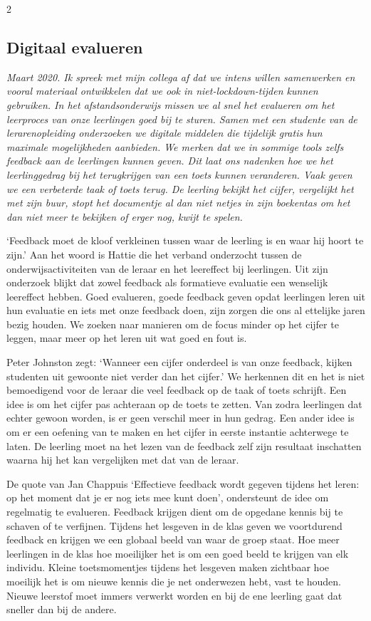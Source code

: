 \begin{multicols}{2}
\subsection{Digitaal evalueren}

\emph{Maart 2020. Ik spreek met mijn collega af dat we intens willen samenwerken en vooral materiaal ontwikkelen dat we ook in niet-lockdown-tijden kunnen gebruiken. In het afstandsonderwijs missen we al snel het evalueren om het leerproces van onze leerlingen goed bij te sturen. Samen met een studente van de lerarenopleiding onderzoeken we digitale middelen die tijdelijk gratis hun maximale mogelijkheden aanbieden. We merken dat we in sommige tools zelfs feedback aan de leerlingen kunnen geven. Dit laat ons nadenken hoe we het leerlinggedrag bij het terugkrijgen van een toets kunnen veranderen. Vaak geven we een verbeterde taak of toets terug. De leerling bekijkt het cijfer, vergelijkt het met zijn buur, stopt het documentje al dan niet netjes in zijn boekentas om het dan niet meer te bekijken of erger nog, kwijt te spelen.}

`Feedback moet de kloof verkleinen tussen waar de leerling is en waar hij hoort te zijn.' Aan het woord is Hattie die het verband onderzocht tussen de onderwijsactiviteiten van de leraar en het leereffect bij leerlingen. Uit zijn onderzoek blijkt dat zowel feedback als formatieve evaluatie een wenselijk leereffect hebben. Goed evalueren, goede feedback geven opdat leerlingen leren uit hun evaluatie en iets met onze feedback doen, zijn zorgen die ons al ettelijke jaren bezig houden. We zoeken naar manieren om de focus minder op het cijfer te leggen, maar meer op het leren uit wat goed en fout is. 

Peter Johnston zegt: `Wanneer een cijfer onderdeel is van onze feedback, kijken studenten uit gewoonte niet verder dan het cijfer.' We herkennen dit en het is niet bemoedigend voor de leraar die veel feedback op de taak of toets schrijft. Een idee is om het cijfer pas achteraan op de toets te zetten. Van zodra leerlingen dat echter gewoon worden, is er geen verschil meer in hun gedrag. Een ander idee is om er een oefening van te maken en het cijfer in eerste instantie achterwege te laten. De leerling moet na het lezen van de feedback zelf zijn resultaat inschatten waarna hij het kan vergelijken met dat van de leraar.

De quote van Jan Chappuis `Effectieve feedback wordt gegeven tijdens het leren: op het moment dat je er nog iets mee kunt doen', ondersteunt de idee om regelmatig te evalueren. Feedback krijgen dient om  de opgedane kennis bij te schaven of te verfijnen. Tijdens het lesgeven in de klas geven we voortdurend feedback en krijgen we een globaal beeld van waar de groep staat. Hoe meer leerlingen in de klas hoe moeilijker het is om een goed beeld te krijgen van elk individu. Kleine toetsmomentjes tijdens het lesgeven maken zichtbaar hoe moeilijk het is om nieuwe kennis die je net onderwezen hebt, vast te houden. Nieuwe leerstof moet immers verwerkt worden en bij de ene leerling gaat dat sneller dan bij de andere. 


\end{multicols}
